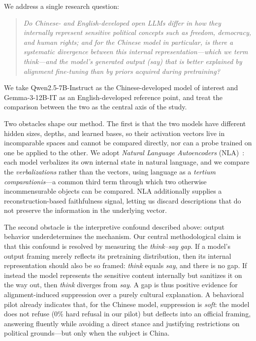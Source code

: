 \documentclass[11pt]{article}
\begin{document}
We address a single research question:
\begin{quote}\itshape
Do Chinese- and English-developed open LLMs differ in how they internally
represent sensitive political concepts such as freedom, democracy, and human
rights; and for the Chinese model in particular, is there a systematic
divergence between this internal representation---which we term
\emph{think}---and the model's generated output (\emph{say}) that is better
explained by alignment fine-tuning than by priors acquired during pretraining?
\end{quote}

\noindent We take Qwen2.5-7B-Instruct as the Chinese-developed model of
interest and Gemma-3-12B-IT as an English-developed reference point, and treat
the comparison between the two as the central axis of the study.

Two obstacles shape our method. The first is that the two models have
different hidden sizes, depths, and learned bases, so their activation vectors
live in incomparable spaces and cannot be compared directly, nor can a probe
trained on one be applied to the other. We adopt \emph{Natural Language
Autoencoders} (NLA)~\citep{nla2026}: each model verbalizes its own internal
state in natural language, and we compare the \emph{verbalizations} rather than
the vectors, using language as a \emph{tertium comparationis}---a common
third term through which two otherwise incommensurable objects can be
compared. NLA additionally supplies a reconstruction-based faithfulness signal,
letting us discard descriptions that do not preserve the information in the
underlying vector.

The second obstacle is the interpretive confound described above: output
behavior underdetermines the mechanism. Our central methodological claim is
that this confound is resolved by measuring the \emph{think--say gap}. If a
model's output framing merely reflects its pretraining distribution, then its
internal representation should also be so framed: \emph{think} equals
\emph{say}, and there is no gap. If instead the model represents the sensitive
content internally but sanitizes it on the way out, then \emph{think} diverges
from \emph{say}. A gap is thus positive evidence for alignment-induced
suppression over a purely cultural explanation. A behavioral pilot already
indicates that, for the Chinese model, suppression is \emph{soft}: the model
does not refuse (0\% hard refusal in our pilot) but deflects into an official
framing, answering fluently while avoiding a direct stance and justifying
restrictions on political grounds---but only when the subject is China.
\end{document}
